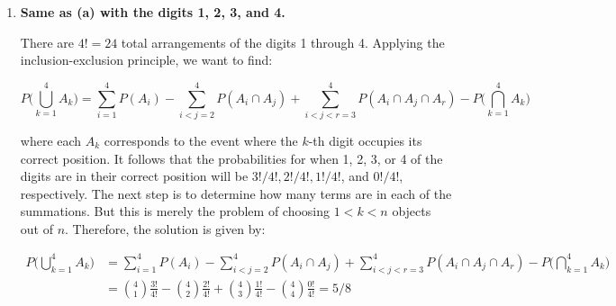 \documentclass[10pt, oneside]{article}
\begin{document}
\begin{enumerate}[label=2.\arabic*]
\begin{enumerate}
	which is a clearer way to think than attempting to figure out the outcomes corresponding to $k$ digits being located in their correct position, an increasingly difficult task for increasing $n$. Then for $n$ numbers, the 	probability that \textbf{one} of the numbers will be in the correct position will be:
	
	\[ \frac{(n-1)!}{n!} \]
	
	Similarly, the probability that \textbf{two} numbers will occupy their correct position is:
	
	\[ \frac{(n-2)!}{n!} \]
	
	and so on and so forth. For $n = 3$, the application of the inclusion-exclusion principle looks like:
	
	\begin{align*}
	P(A \cup B \cup C) &= P(A) + P(B) + P(C) - P(A \cap B) - P(A \cap C) - P(B \cap C) + P(A \cap B \cap C) \\
	&= \frac{2!}{3!} +  \frac{2!}{3!} +  \frac{2!}{3!} - \frac{1!}{3!} -  \frac{1!}{3!} -  \frac{1!}{3!} +  \frac{1!}{3!} = \boxed{2/3}
	\end{align*}
	\item \begin{tcolorbox}[
  colback=Cerulean!5!white,
  colframe=Cerulean!75!black] \textbf{Same as (a) with the digits 1, 2, 3, and 4.}
	\end{tcolorbox}
	
	There are $4! = 24$ total arrangements of the digits 1 through 4. Applying the inclusion-exclusion principle, we want to find:
	
	\[ P\Bigg( \bigcup^4_{k=1} A_k \Bigg) = \sum_{i = 1}^4 P(A_i) - \sum_{i < j = 2}^4 P(A_i \cap A_j) + \sum_{i < j < r = 3}^4 P(A_i \cap A_j \cap A_r) - P \Bigg( \bigcap^4_{k=1} A_k \Bigg) \]
	
	where each $A_k$ corresponds to the event where the $k$-th digit occupies its correct position. It follows that the probabilities for when 1, 2, 3, or 4 of the digits are in their correct position will be $3! / 4!, 2! / 4!, 1! / 4!$, and $0! / 4!$, respectively. The next step is to determine how many terms are in each of the summations. But this is merely the problem of choosing $1 < k < n$ objects out of $n$. Therefore, the solution is given by:
	
	\begin{align*}
	P\Bigg( \bigcup^4_{k=1} A_k \Bigg) &= \sum_{i = 1}^4 P(A_i) - \sum_{i < j = 2}^4 P(A_i \cap A_j) + \sum_{i < j < r = 3}^4 P(A_i \cap A_j \cap A_r) - P \Bigg( \bigcap^4_{k=1} A_k \Bigg)  \\
	&= \binom {4}{1} \frac{3!}{4!} - \binom {4}{2} \frac{2!}{4!} + \binom{4}{3} \frac{1!}{4!} - \binom{4}{4} \frac{0!}{4!} = \boxed{5/8}
	\end{align*}


\end{enumerate}
\end{enumerate}
\end{document}
